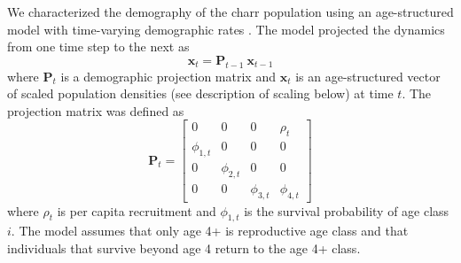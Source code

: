 We characterized the demography of the charr population 
using an age-structured model \citep{caswell2001matrix}
with time-varying demographic rates \citep{zeng1998, nielsen2014estimation}.
The model projected the dynamics from one time step to the next as
%
\begin{equation} \label{eq:XPX}
    \mathbf{x}_t = \mathbf{P}_{t-1}~\mathbf{x}_{t-1}
\end{equation}
%
where $\mathbf{P}_{t}$ is a demographic projection matrix
and $\mathbf{x}_t$ is an age-structured vector of scaled population densities 
(see description of scaling below) at time $t$.
%
The projection matrix was defined as
%
\begin{equation} \label{eq:matrix}
\mathbf{P}_{t} = 
\left[
\begin{array}{cccccccc}
    0             & 0             & 0             & \rho_{t}     \\
    \phi_{1,t}    & 0             & 0             & 0            \\
    0             & \phi_{2,t}    & 0             & 0            \\
    0             & 0             & \phi_{3,t}    & \phi_{4,t}
    \end{array}
\right]
\end{equation}
%
where $\rho_{t}$ is per capita recruitment 
and $\phi_{1,t}$ is the survival probability of age class $i$. 
The model assumes that only age 4+ is reproductive age class 
and that individuals that survive beyond age 4 return to the age 4+ class.


